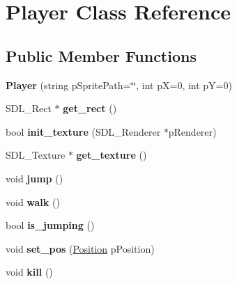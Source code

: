\hypertarget{classPlayer}{}\section{Player Class Reference}
\label{classPlayer}
\subsection*{Public Member Functions}
\begin{DoxyCompactItemize}
\item 
\mbox{\label{classPlayer_a404fc6b75751623e7d3127201f848b00}} 
{\bfseries Player} (string p\+Sprite\+Path=\char`\"{}\char`\"{}, int pX=0, int pY=0)
\item 
\mbox{\label{classPlayer_a709d8e62ca46e27aed73271a3566d651}} 
S\+D\+L\+\_\+\+Rect $\ast$ {\bfseries get\+\_\+rect} ()
\item 
\mbox{\label{classPlayer_ad0a16e3921fc33a984822bd540f25e4a}} 
bool {\bfseries init\+\_\+texture} (S\+D\+L\+\_\+\+Renderer $\ast$p\+Renderer)
\item 
\mbox{\label{classPlayer_a9c986201b1c627c137f760a0beaebf0a}} 
S\+D\+L\+\_\+\+Texture $\ast$ {\bfseries get\+\_\+texture} ()
\item 
\mbox{\label{classPlayer_a70e21ca98281b7d72f105f2693113d7e}} 
void {\bfseries jump} ()
\item 
\mbox{\label{classPlayer_af47efc290076c0079c11bcdd5b37673d}} 
void {\bfseries walk} ()
\item 
\mbox{\label{classPlayer_a8af6218de14b10bb4538c937512adfd4}} 
bool {\bfseries is\+\_\+jumping} ()
\item 
\mbox{\label{classPlayer_a264829ab052e7818dc0575feeee2331f}} 
void {\bfseries set\+\_\+pos} (\hyperlink{classPosition}{Position} p\+Position)
\item 
\mbox{\label{classPlayer_ab5d570eef42811790ef64f4acb88368a}} 
void {\bfseries kill} ()
\item 
\mbox{\label{classPlayer_a4804db8f3648dca149c35c27806d88a5}} 

\end{DoxyCompactItemize}
